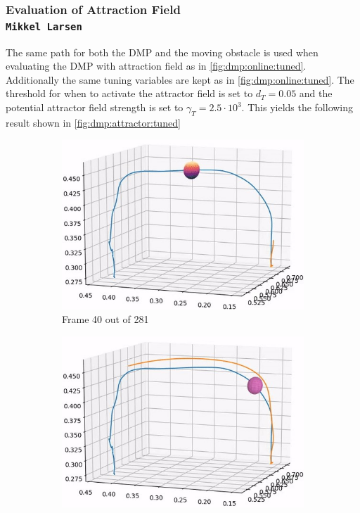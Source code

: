 \documentclass[../main.tex]{subfiles}
\begin{document}
\subsubsection{Evaluation of Attraction Field \\ \normalfont\normalsize\texttt{Mikkel Larsen}}
The same path for both the DMP and the moving obstacle is used when evaluating the DMP with attraction field as in \autoref{fig:dmp:online:tuned}. Additionally the same tuning variables are kept as in \autoref{fig:dmp:online:tuned}. The threshold for when to activate the attractor field is set to $d_{T}=0.05$ and the potential attractor field strength is set to $\gamma_T = 2.5\cdot10^{3}$. This yields the following result shown in \autoref{fig:dmp:attractor:tuned}

\begin{figure}[H]
    \centering
    \begin{subfigure}[b]{0.32\textwidth}
        \centering
        \includegraphics[width=\textwidth]{figures/online_obs/attractor/3D_tuned_w_attractor-40.jpg}
         \caption{Frame 40 out of 281}
    \end{subfigure}
    \begin{subfigure}[b]{0.32\textwidth}
        \centering
        \includegraphics[width=\textwidth]{figures/online_obs/attractor/3D_tuned_w_attractor-70.jpg}

\end{subfigure}
\end{figure}
\end{document}
